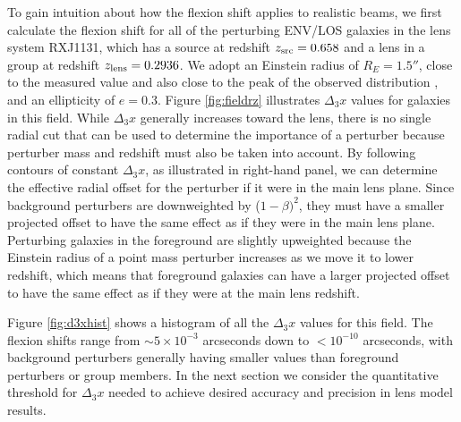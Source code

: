 \documentclass{emulateapj}
\begin{document}
To gain intuition about how the flexion shift applies to realistic beams, we first calculate the flexion shift for all of the perturbing ENV/LOS galaxies in the lens system RXJ1131, which has a source at redshift $z_{\rm{src}} = 0.658$ and a lens in a group at redshift $z_{\rm{lens}} = 0.2936$.  We adopt an Einstein radius of $R_E = 1.5''$, close to the measured value \citep{Suyu13} and also close to the peak of the observed distribution \citep{Sonnenfeld13}, and an ellipticity of $e=0.3$.  Figure \ref{fig:fieldrz} illustrates $\Delta_3 x$ values for galaxies in this field.  While $\Delta_3 x$ generally increases toward the lens, there is no single radial cut that can be used to determine the importance of a perturber because perturber mass and redshift must also be taken into account.  By following contours of constant $\Delta_3 x$, as illustrated in right-hand panel, we can determine the effective radial offset for the perturber if it were in the main lens plane. Since background perturbers are downweighted by ($1-\beta)^2$, they must have a smaller projected offset to have the same effect as if they were in the main lens plane. Perturbing galaxies in the foreground are slightly upweighted because the Einstein radius of a point mass perturber increases as we move it to lower redshift, which means that foreground galaxies can have a larger projected offset to have the same effect as if they were at the main lens redshift.

Figure \ref{fig:d3xhist} shows a histogram of all the $\Delta_3 x$ values for this field.  The flexion shifts range from $\sim 5 \times 10^{-3}$ arcseconds down to $<10^{-10}$ arcseconds, with background perturbers generally having smaller values than foreground perturbers or group members.  In the next section we consider the quantitative threshold for $\Delta_3 x$ needed to achieve desired accuracy and precision in lens model results.
\end{document}
